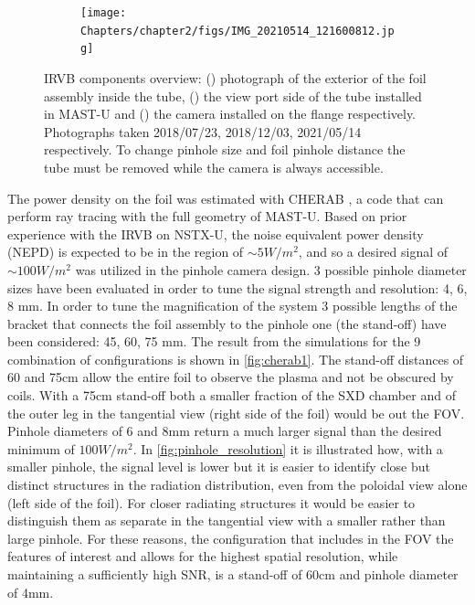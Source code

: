 \begin{figure}[!ht]
\begin{subfigure}{0.49\linewidth}
         \caption{}
         \label{fig:IRVB5}
     \end{subfigure}
     \centering
     \begin{subfigure}{0.8\linewidth}
         \texttt{[image: Chapters/chapter2/figs/IMG\_20210514\_121600812.jpg]}
         \caption{}
         \label{fig:IRVB6}
     \end{subfigure}

    \caption{IRVB components overview: () photograph of the exterior of the foil assembly inside the tube, () the view port side of the tube installed in MAST-U and () the camera installed on the flange respectively. Photographs taken 2018/07/23, 2018/12/03, 2021/05/14 respectively. To change pinhole size and foil pinhole distance the tube must be removed while the camera is always accessible.}
    \label{fig:IRVB_components}
\end{figure}

The power density on the foil was estimated with CHERAB \cite{C.GiroudA.MeakinsM.CarrA.Baciero2018,Carr2017,A.MeakinsCarrM.2017}, a code that can perform ray tracing with the full geometry of MAST-U. Based on prior experience with the IRVB on NSTX-U\cite{Reinke2018}, the noise equivalent power density (NEPD) is expected to be in the region of $\sim5 W/m^2$, and so a desired signal of $\sim100 W/m^2$ was utilized in the pinhole camera design. 3 possible pinhole diameter sizes have been evaluated in order to tune the signal strength and resolution: 4, 6, 8 mm. In order to tune the magnification of the system 3 possible lengths of the bracket that connects the foil assembly to the pinhole one (the stand-off) have been considered: 45, 60, 75 mm. The result from the simulations for the 9 combination of configurations is shown in \autoref{fig:cherab1}.\cite{Federici2022} The stand-off distances of 60 and 75cm allow the entire foil to observe the plasma and not be obscured by coils. With a 75cm stand-off both a smaller fraction of the SXD chamber and of the outer leg in the tangential view (right side of the foil) would be out the FOV. Pinhole diameters of 6 and 8mm return a much larger signal than the desired minimum of $100 W/m^2$. In \autoref{fig:pinhole_resolution} it is illustrated how, with a smaller pinhole, the signal level is lower but it is easier to identify close but distinct structures in the radiation distribution, even from the poloidal view alone (left side of the foil). For closer radiating structures it would be easier to distinguish them as separate in the tangential view  with a smaller rather than large pinhole. For these reasons, the configuration that includes in the FOV the features of interest and allows for the highest spatial resolution, while maintaining a sufficiently high SNR, is a stand-off of 60cm and pinhole diameter of 4mm.

